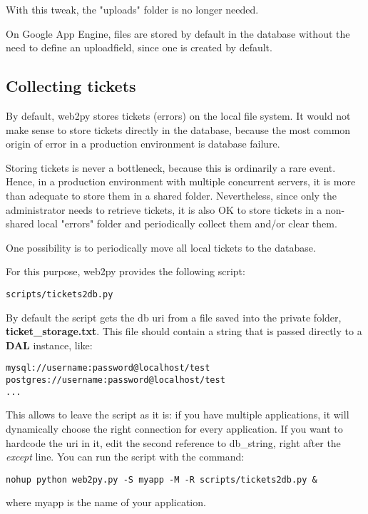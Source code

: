 \documentclass[justified,sixbynine,notoc]{tufte-book}
\begin{document}
\begin{fullwidth}
With this tweak, the "uploads" folder is no longer needed.

On Google App Engine, files are stored by default in the database without the need to define an uploadfield, since one is created by default.

\goodbreak\subsection{Collecting tickets}

By default, web2py stores tickets (errors) on the local file system. It would not make sense to store tickets directly in the database, because the most common origin of error in a production environment is database failure.

Storing tickets is never a bottleneck, because this is ordinarily a rare event. Hence, in a production environment with multiple concurrent servers, it is more than adequate to store them in a shared folder. Nevertheless, since only the administrator needs to retrieve tickets, it is also OK to store tickets in a non-shared local "errors" folder and periodically collect them and/or clear them.

One possibility is to periodically move all local tickets to the database.

For this purpose, web2py provides the following script:
\begin{lstlisting}
scripts/tickets2db.py
\end{lstlisting}

By default the script gets the db uri from a file saved into the private folder, {\bf ticket\_storage.txt}. This file should contain a string that is passed directly to a {\bf DAL} instance, like:

\begin{lstlisting}
mysql://username:password@localhost/test
postgres://username:password@localhost/test
...
\end{lstlisting}

This allows to leave the script as it is: if you have multiple applications, it will dynamically choose the right connection for every application. If you want to hardcode the uri in it, edit the second reference to db\_string, right after the {\it except} line.
You can run the script with the command:
\begin{lstlisting}
nohup python web2py.py -S myapp -M -R scripts/tickets2db.py &
\end{lstlisting}
\noindent where myapp is the name of your application.


\end{fullwidth}
\end{document}
